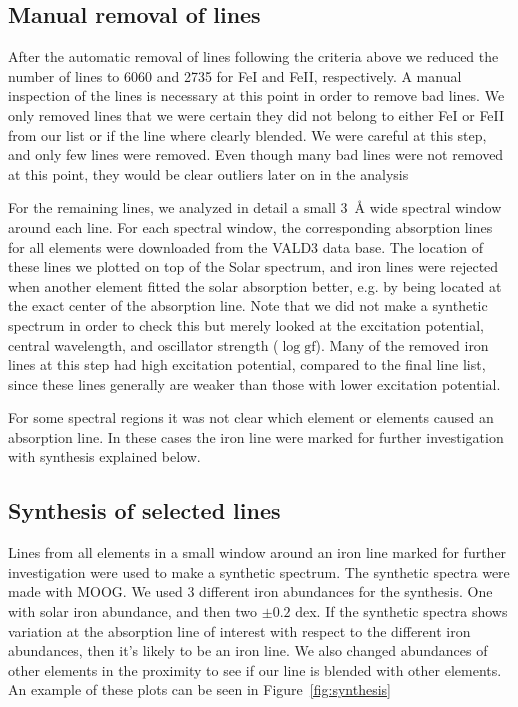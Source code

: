 \documentclass{aa}
\begin{document}
\subsection{Manual removal of lines}
\label{sub:manual_removal_of_lines}
After the automatic removal of lines following the criteria above
we reduced the number of lines to 6060 and 2735 for FeI and FeII,
respectively. A manual inspection of the lines is necessary at this
point in order to remove bad lines. We only removed lines that we were
certain they did not belong to either FeI or FeII from our list or if
the line where clearly blended. We were careful at this step, and only
few lines were removed. Even though many bad lines were not removed at
this point, they would be clear outliers later on in the analysis

For the remaining lines, we analyzed in detail a small \SI{3}{\angstrom}
wide spectral window around each line. For each spectral window, the
corresponding absorption lines for all elements were downloaded from the
VALD3 data base. The location of these lines we plotted on top of the
Solar spectrum, and iron lines were rejected when another element fitted
the solar absorption better, e.g. by being located at the exact center
of the absorption line. Note that we did not make a synthetic spectrum
in order to check this but merely looked at the excitation potential,
central wavelength, and oscillator strength ($\log \mathrm{gf}$). Many
of the removed iron lines at this step had high excitation potential,
compared to the final line list, since these lines generally are weaker
than those with lower excitation potential.


For some spectral regions it was not clear which element or elements
caused an absorption line. In these cases the iron line were marked for
further investigation with synthesis explained below.



\subsection{Synthesis of selected lines}
\label{sub:synthesis_of_selected_lines}
Lines from all elements in a small window around an iron line marked
for further investigation were used to make a synthetic spectrum.
The synthetic spectra were made with MOOG. We used 3 different iron
abundances for the synthesis. One with solar iron abundance, and
then two $\pm0.2$ dex. If the synthetic spectra shows variation at
the absorption line of interest with respect to the different iron
abundances, then it's likely to be an iron line. We also changed
abundances of other elements in the proximity to see if our line is
blended with other elements. An example of these plots can be seen
in Figure~\ref{fig:synthesis}
\end{document}

